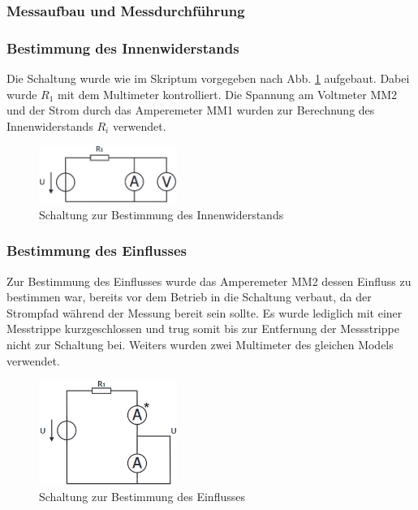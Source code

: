 \documentclass[a4paper]{article}
\begin{document}
\subsubsection{Messaufbau und Messdurchführung}
\subsubsection*{Bestimmung des Innenwiderstands}
Die Schaltung wurde wie im Skriptum vorgegeben nach Abb. \ref{fig:2a_RiAM} aufgebaut.
Dabei wurde $R_{1}$ mit dem Multimeter kontrolliert. Die Spannung am Voltmeter MM2
und der Strom durch das Amperemeter MM1 wurden zur Berechnung des Innenwiderstands
$R_{i}$ verwendet.

\begin{figure}[h]
    \centering
    \includegraphics[width=0.4\textwidth]{schematics/2a_RiAM.png}
    \caption{Schaltung zur Bestimmung des Innenwiderstands}
    \label{fig:2a_RiAM}
\end{figure}

\subsubsection*{Bestimmung des Einflusses}
Zur Bestimmung des Einflusses wurde das Amperemeter MM2 dessen Einfluss zu bestimmen war,
bereits vor dem Betrieb in die Schaltung verbaut, da der Strompfad während der 
Messung bereit sein sollte. Es wurde lediglich mit einer Messtrippe kurzgeschlossen
und trug somit bis zur Entfernung der Messstrippe nicht zur Schaltung bei.
Weiters wurden zwei Multimeter des gleichen Models verwendet.

\begin{figure}[h]
    \centering
    \includegraphics[width=0.4\textwidth]{schematics/2b_EinflussAM.png}
    \caption{Schaltung zur Bestimmung des Einflusses}
    \label{fig:2b_EinflussAM}
\end{figure}
\end{document}

